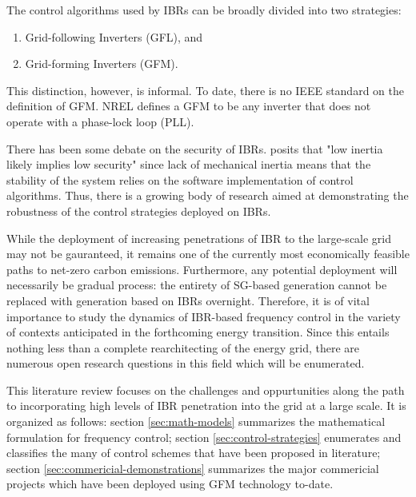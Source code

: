 The control algorithms used by IBRs can be broadly divided into two strategies:
\begin{enumerate}
  \item Grid-following Inverters (GFL), and
  \item Grid-forming Inverters (GFM).
\end{enumerate}

This distinction, however, is informal. To date, there is no IEEE standard
on the definition of GFM. NREL defines a GFM to be any inverter that does 
not operate with a phase-lock loop (PLL). %

There has been some debate on the security of IBRs. %
posits that "low inertia likely implies low security" since
lack of mechanical inertia means that the stability of the system
relies on the software implementation of control algorithms. Thus,
there is a growing body of research aimed at demonstrating the 
robustness of the control strategies deployed on IBRs.

While the deployment of increasing penetrations of IBR to the large-scale
grid may not be gauranteed, it remains one of the currently most 
economically feasible paths to net-zero carbon emissions. Furthermore,
any potential deployment will necessarily be gradual process: the entirety of
SG-based generation cannot be replaced with generation based on IBRs
overnight. Therefore, it is of vital importance to study the 
dynamics of IBR-based frequency control in the variety of contexts
anticipated in the forthcoming energy transition. Since this
entails nothing less than a complete rearchitecting of the energy
grid, there are numerous open research questions in this field
which will be enumerated.

This literature review focuses on the challenges and oppurtunities along
the path to incorporating high levels of IBR penetration into the grid 
at a large scale. It is organized as follows: section \ref{sec:math-models}
summarizes the mathematical formulation for frequency control; section
\ref{sec:control-strategies} enumerates and classifies the many
of control schemes that have been proposed in literature; section
\ref{sec:commericial-demonstrations} summarizes the major commericial
projects which have been deployed using GFM technology to-date.



